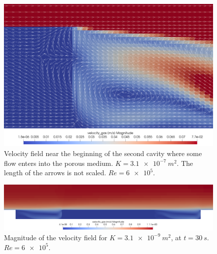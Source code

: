 \documentclass[11pt, a4paper]{article}
\theoremstyle{definition}
\begin{document}
\begin{figure}
	\centering
	\includegraphics[width=\textwidth]{coupled_second_cavity.png}
	\caption{Velocity field near the beginning of the second cavity where some 
flow enters into the porous medium. $K=\SI{3.1e-7}{m^2}$. The length of the 
arrows is not scaled. $Re=\num{6e5}$.}
	\label{fig:coupledsecondcav}
\end{figure}

\begin{figure}
	\centering
	\includegraphics[width=\textwidth]{coupled_vel_3.png}
	\caption{Magnitude of the velocity field for $K=\SI{3.1e-9}{m^2}$, at 
	$t=\SI{30}{s}$. $Re=\num{6e5}$.}
	\label{fig:coupled_vel_3}
\end{figure}
\end{document}
